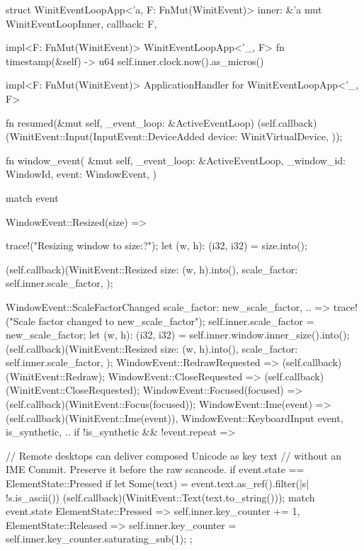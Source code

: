 struct WinitEventLoopApp<'a, F: FnMut(WinitEvent)> {
    inner: &'a mut WinitEventLoopInner,
    callback: F,
}

impl<F: FnMut(WinitEvent)> WinitEventLoopApp<'_, F> {
    fn timestamp(&self) -> u64 {
        self.inner.clock.now().as_micros()
    }
}

impl<F: FnMut(WinitEvent)> ApplicationHandler for WinitEventLoopApp<'_, F> {
    fn resumed(&mut self, _event_loop: &ActiveEventLoop) {
        (self.callback)(WinitEvent::Input(InputEvent::DeviceAdded {
            device: WinitVirtualDevice,
        }));
    }

    fn window_event(
        &mut self,
        _event_loop: &ActiveEventLoop,
        _window_id: WindowId,
        event: WindowEvent,
    ) {
        match event {
            WindowEvent::Resized(size) => {
                trace!("Resizing window to {size:?}");
                let (w, h): (i32, i32) = size.into();

                (self.callback)(WinitEvent::Resized {
                    size: (w, h).into(),
                    scale_factor: self.inner.scale_factor,
                });
            }
            WindowEvent::ScaleFactorChanged {
                scale_factor: new_scale_factor,
                ..
            } => {
                trace!("Scale factor changed to {new_scale_factor}");
                self.inner.scale_factor = new_scale_factor;
                let (w, h): (i32, i32) = self.inner.window.inner_size().into();
                (self.callback)(WinitEvent::Resized {
                    size: (w, h).into(),
                    scale_factor: self.inner.scale_factor,
                });
            }
            WindowEvent::RedrawRequested => {
                (self.callback)(WinitEvent::Redraw);
            }
            WindowEvent::CloseRequested => {
                (self.callback)(WinitEvent::CloseRequested);
            }
            WindowEvent::Focused(focused) => {
                (self.callback)(WinitEvent::Focus(focused));
            }
            WindowEvent::Ime(event) => (self.callback)(WinitEvent::Ime(event)),
            WindowEvent::KeyboardInput {
                event,
                is_synthetic,
                ..
            } if !is_synthetic && !event.repeat => {
                // Remote desktops can deliver composed Unicode as key text
                // without an IME Commit. Preserve it before the raw scancode.
                if event.state == ElementState::Pressed {
                    if let Some(text) = event.text.as_ref().filter(|s| !s.is_ascii()) {
                        (self.callback)(WinitEvent::Text(text.to_string()));
                    }
                }
                match event.state {
                    ElementState::Pressed => self.inner.key_counter += 1,
                    ElementState::Released => {
                        self.inner.key_counter = self.inner.key_counter.saturating_sub(1);
                    }
                };

}}}}

